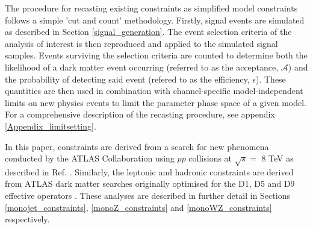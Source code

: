 
The procedure for recasting existing \monoX constraints as simplified model constraints follows a simple 'cut and count' methodology. Firstly, signal events are simulated as described in Section \ref{signal_generation}. The event selection criteria of the \monoX analysis of interest is then reproduced and applied to the simulated signal samples. Events surviving the selection criteria are counted to determine both the likelihood of a dark matter event occurring (referred to as the acceptance, $\mathcal{A}$) and the probability of detecting said event (refered to as the efficiency, $\epsilon$). These quantities are then used in combination with channel-specific model-independent limits on new physics events to limit the parameter phase space of a given model.
For a comprehensive description of the recasting procedure, see appendix \ref{Appendix_limitsetting}.

In this paper, \monojet constraints are derived from a search for new phenomena conducted by the ATLAS Collaboration using $pp$ collisions at $\sqrt{s}=$ 8 TeV as described in Ref. \cite{Aad:2015zva}. Similarly, the leptonic \monoZ and hadronic \monoWZ constraints are derived from ATLAS dark matter searches originally optimised for the D1, D5 and D9 effective operators \cite{Aad:2014monoZlep, ATLASmonoWZ}. These analyses are described in further detail in Sections \ref{monojet_constraints}, \ref{monoZ_constraints} and \ref{monoWZ_constraints} respectively.


